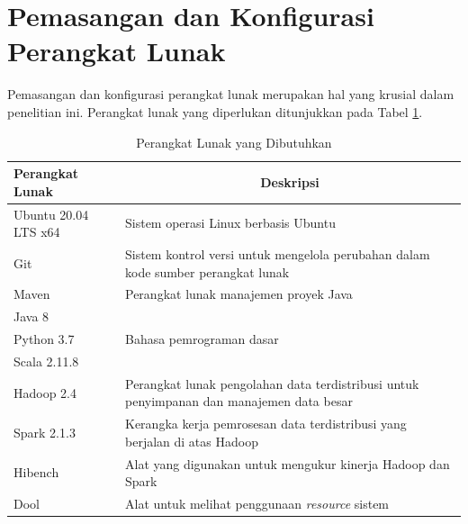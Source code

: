 \section{Pemasangan dan Konfigurasi Perangkat Lunak}
Pemasangan dan konfigurasi perangkat lunak merupakan hal yang krusial dalam penelitian ini. Perangkat lunak yang diperlukan ditunjukkan pada Tabel \ref{table:software-needs}.

\begin{table}[h]
	\centering
	\caption{Perangkat Lunak yang Dibutuhkan}
		\begin{tabular}{l p{9cm}} 
		\toprule
			\textbf{Perangkat Lunak} & \multicolumn{1}{c}{\textbf{Deskripsi}}                                                                                \\ 
            \midrule
			Ubuntu 20.04 LTS x64     & Sistem operasi Linux berbasis Ubuntu  \\ 
			Git                      & Sistem kontrol versi untuk mengelola perubahan dalam kode sumber perangkat lunak                                       \\
			Maven                    & Perangkat lunak manajemen proyek Java                            \\ 
			Java 8                   & \multirow{3}{*}{Bahasa pemrograman dasar}                                 \\ 
			Python 3.7               &                                                                                                                        \\
			Scala 2.11.8               &                                                                                                                        \\
			Hadoop 2.4                & Perangkat lunak pengolahan data terdistribusi untuk penyimpanan dan manajemen data besar                               \\ 
			Spark 2.1.3               & Kerangka kerja pemrosesan data terdistribusi yang berjalan di atas Hadoop                                              \\ 
			Hibench   & Alat yang digunakan untuk mengukur kinerja Hadoop dan Spark                                                            \\
			Dool   & Alat untuk melihat penggunaan \textit{resource} sistem                                                             \\
            \bottomrule 
		\end{tabular}
	\label{table:software-needs}
\end{table}



